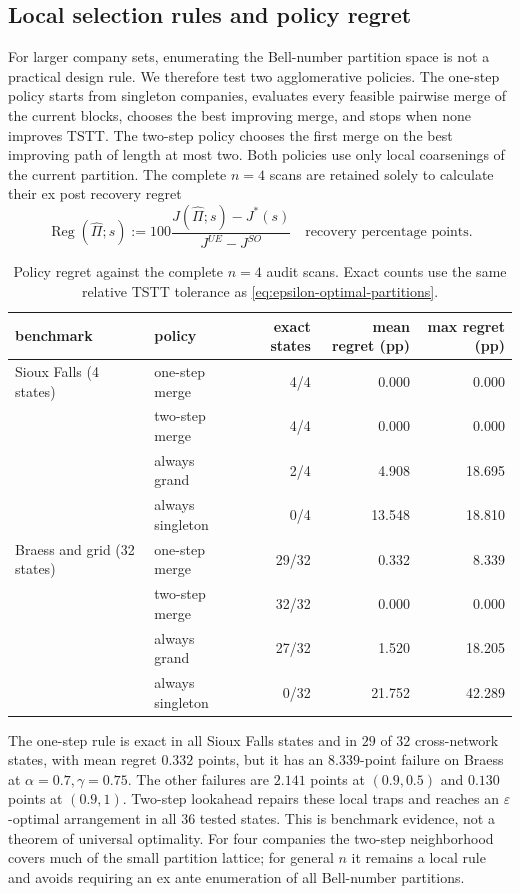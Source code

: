 \subsection{Local selection rules and policy regret}\label{sec:policy-regret}

For larger company sets, enumerating the Bell-number partition space is not a
practical design rule. We therefore test two agglomerative policies. The
one-step policy starts from singleton companies, evaluates every feasible
pairwise merge of the current blocks, chooses the best improving merge, and
stops when none improves TSTT. The two-step policy chooses the first merge on
the best improving path of length at most two. Both policies use only local
coarsenings of the current partition. The complete $n=4$ scans are retained
solely to calculate their ex post recovery regret
\begin{equation}\label{eq:policy-regret}
 \operatorname{Reg}(\widehat\Pi;s)
 :=100\frac{J(\widehat\Pi;s)-J^*(s)}{J^{UE}-J^{SO}}
 \quad\text{recovery percentage points}.
\end{equation}

\begin{table}[!htbp]
\centering
\small
\caption{Policy regret against the complete $n=4$ audit scans. Exact counts use the same relative TSTT tolerance as \eqref{eq:epsilon-optimal-partitions}.}
\label{tab:policy-regret}
\begin{tabular}{llrrr}
\toprule
benchmark & policy & exact states & mean regret (pp) & max regret (pp)\\
\midrule
Sioux Falls (4 states) & one-step merge & 4/4 & 0.000 & 0.000\\
 & two-step merge & 4/4 & 0.000 & 0.000\\
 & always grand & 2/4 & 4.908 & 18.695\\
 & always singleton & 0/4 & 13.548 & 18.810\\
\addlinespace
Braess and grid (32 states) & one-step merge & 29/32 & 0.332 & 8.339\\
 & two-step merge & 32/32 & 0.000 & 0.000\\
 & always grand & 27/32 & 1.520 & 18.205\\
 & always singleton & 0/32 & 21.752 & 42.289\\
\bottomrule
\end{tabular}
\end{table}

The one-step rule is exact in all Sioux Falls states and in $29$ of $32$
cross-network states, with mean regret $0.332$ points, but it has an $8.339$-point
failure on Braess at $\alpha=0.7,\gamma=0.75$. The other failures are $2.141$
points at $(0.9,0.5)$ and $0.130$ points at $(0.9,1)$. Two-step lookahead
repairs these local traps and reaches an $\varepsilon$-optimal arrangement in
all $36$ tested states. This is benchmark evidence, not a theorem of universal
optimality. For four companies the two-step neighborhood covers much of the
small partition lattice; for general $n$ it remains a local rule and avoids
requiring an ex ante enumeration of all Bell-number partitions.

